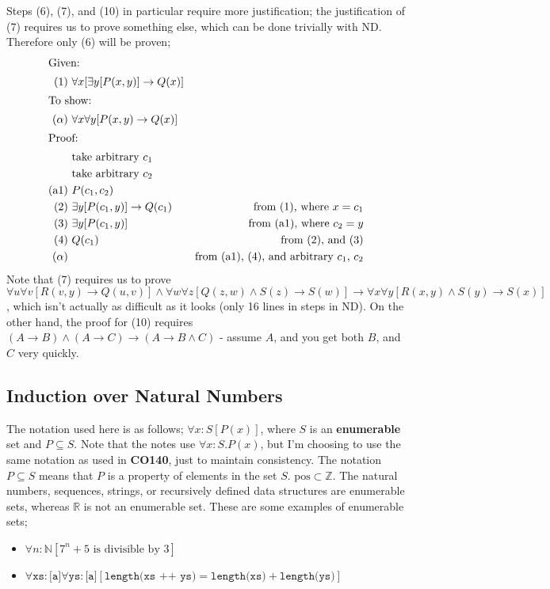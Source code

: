 \documentclass[a4paper, 12pt]{article}
\newcommand{\proofline}[3]{(#1)\ & #2 & \text{#3} \\}
\newcommand{\proofarbitrary}[1]{& \text{take arbitrary } #1 \\}
\begin{document}
                Steps (6), (7), and (10) in particular require more justification; the justification of (7) requires us to prove something else, which can be done trivially with ND. Therefore only (6) will be proven;
                \begin{align*}
                    \intertext{Given:}
                    \proofline{1}{\forall x [\exists y [P(x, y)] \rightarrow Q(x)]}{}
                    \intertext{To show:}
                    \proofline{\alpha}{\forall x \forall y [P(x, y) \rightarrow Q(x)]}{}
                    \intertext{Proof:}
                    \proofarbitrary{c_1}
                    \proofarbitrary{c_2}
                    \proofline{\text{a}1}{P(c_1, c_2)}{}
                    \proofline{2}{\exists y [P(c_1, y)] \rightarrow Q(c_1)}{from (1), where $x = c_1$}
                    \proofline{3}{\exists y [P(c_1, y)]}{from (a1), where $c_2 = y$}
                    \proofline{4}{Q(c_1)}{from (2), and (3)}
                    \proofline{\alpha}{}{from (a1), (4), and arbitrary $c_1$, $c_2$}
                \end{align*}
                Note that (7) requires us to prove $\forall u \forall v [R(v, y) \rightarrow Q(u, v)] \land \forall w \forall z [Q(z, w) \land S(z) \rightarrow S(w)] \rightarrow \forall x \forall y [R(x, y) \land S(y)\rightarrow S(x)]$, which isn't actually as difficult as it looks (only 16 lines in steps in ND). On the other hand, the proof for (10) requires $(A \rightarrow B) \land (A \rightarrow C) \rightarrow (A \rightarrow B \land C)$ - assume $A$, and you get both $B$, and $C$ very quickly.
        \subsection*{Induction over Natural Numbers}
            The notation used here is as follows; $\forall x : S [P(x)]$, where $S$ is an \textbf{enumerable} set and $P \subseteq S$. Note that the notes use $\forall x : S.P(x)$, but I'm choosing to use the same notation as used in \textbf{CO140}, just to maintain consistency. The notation $P \subseteq S$ means that $P$ is a property of elements in the set $S$. $\text{pos} \subset \mathbb{Z}$. The natural numbers, sequences, strings, or recursively defined data structures are enumerable sets, whereas $\mathbb{R}$ is not an enumerable set. These are some examples of enumerable sets;
            \begin{itemize}
                \itemsep0em
                \item $\forall n : \mathbb{N} [7^n + 5 \text{ is divisible by 3}]$
                \item $\forall \texttt{xs}:\texttt{[a]}\forall \texttt{ys}:\texttt{[a]}[\texttt{length(xs ++ ys)} = \texttt{length(xs)} + \texttt{length(ys)}]$
            \end{itemize}
\end{document}
